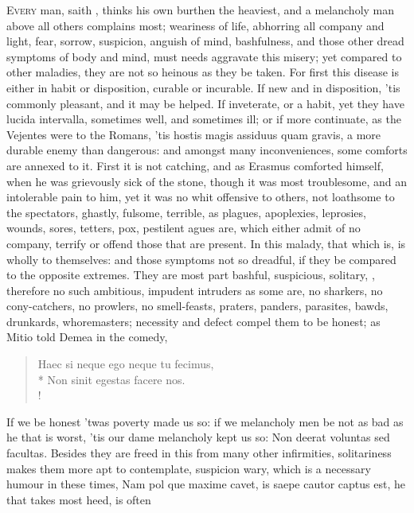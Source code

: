{\lettrine{E}{very} man, saith \Seneca, thinks his own burthen the heaviest, and
a melancholy man above all others complains most; weariness of life,
abhorring all company and light, fear, sorrow, suspicion, anguish of
mind, bashfulness, and those other dread symptoms of body and mind,
must needs aggravate this misery; yet compared to other maladies, they
are not so heinous as they be taken. For first this disease is either
in habit or disposition, curable or incurable. If new and in
disposition, 'tis commonly pleasant, and it may be helped. If
inveterate, or a habit, yet they have lucida intervalla, sometimes
well, and sometimes ill; or if more continuate, as the Vejentes
were to the Romans, 'tis hostis magis assiduus quam gravis, a more
durable enemy than dangerous: and amongst many inconveniences, some
comforts are annexed to it. First it is not catching, and as Erasmus
comforted himself, when he was grievously sick of the stone, though it
was most troublesome, and an intolerable pain to him, yet it was no
whit offensive to others, not loathsome to the spectators, ghastly,
fulsome, terrible, as plagues, apoplexies, leprosies, wounds, sores,
tetters, pox, pestilent agues are, which either admit of no company,
terrify or offend those that are present. In this malady, that which
is, is wholly to themselves: and those symptoms not so dreadful, if
they be compared to the opposite extremes. They are most part bashful,
suspicious, solitary, \etc{}, therefore no such ambitious, impudent
intruders as some are, no sharkers, no cony-catchers, no prowlers, no
smell-feasts, praters, panders, parasites, bawds, drunkards,
whoremasters; necessity and defect compel them to be honest; as Mitio
told Demea in the comedy,
%
\begin{latin}%
\begin{verse}%
Haec si neque ego neque tu fecimus,\\*
Non sinit egestas facere nos.\\!
\end{verse}%
\end{latin}%
%
If we be honest 'twas poverty made us so: if we melancholy men be not
as bad as he that is worst, 'tis our dame melancholy kept us so: Non
deerat voluntas sed facultas. 
Besides they are freed in this from many other infirmities,
solitariness makes them more apt to contemplate, suspicion wary, which
is a necessary humour in these times, Nam pol que maxime cavet,
is saepe cautor captus est, he that takes most heed, is often
}
